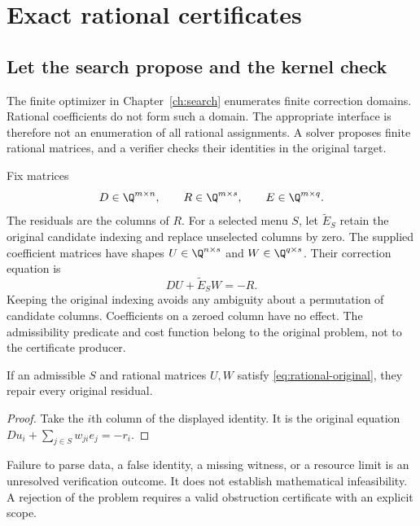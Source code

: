 \chapter{Exact rational certificates}\label{ch:rational}
\section{Let the search propose and the kernel check}
The finite optimizer in Chapter~\ref{ch:search} enumerates finite correction domains. Rational coefficients do not form such a domain. The appropriate interface is therefore not an enumeration of all rational assignments. A solver proposes finite rational matrices, and a verifier checks their identities in the original target.

Fix matrices
\[
 D\in\Q^{m\times n},\qquad R\in\Q^{m\times s},\qquad E\in\Q^{m\times q}.
\]
The residuals are the columns of $R$. For a selected menu $S$, let $\widetilde E_S$ retain the original candidate indexing and replace unselected columns by zero. The supplied coefficient matrices have shapes $U\in\Q^{n\times s}$ and $W\in\Q^{q\times s}$. Their correction equation is
\begin{equation}\label{eq:rational-original}
 DU+\widetilde E_SW=-R.
\end{equation}
Keeping the original indexing avoids any ambiguity about a permutation of candidate columns. Coefficients on a zeroed column have no effect. The admissibility predicate and cost function belong to the original problem, not to the certificate producer.

\begin{proposition}\label{prop:rational-success}
If an admissible $S$ and rational matrices $U,W$ satisfy \eqref{eq:rational-original}, they repair every original residual.
\end{proposition}
\begin{proof}
Take the $i$th column of the displayed identity. It is the original equation $Du_i+\sum_{j\in S}w_{ji}e_j=-r_i$.
\end{proof}

\begin{scopebox}[title=A rejected certificate is not a rejected problem]
Failure to parse data, a false identity, a missing witness, or a resource limit is an unresolved verification outcome. It does not establish mathematical infeasibility. A rejection of the problem requires a valid obstruction certificate with an explicit scope.
\end{scopebox}

